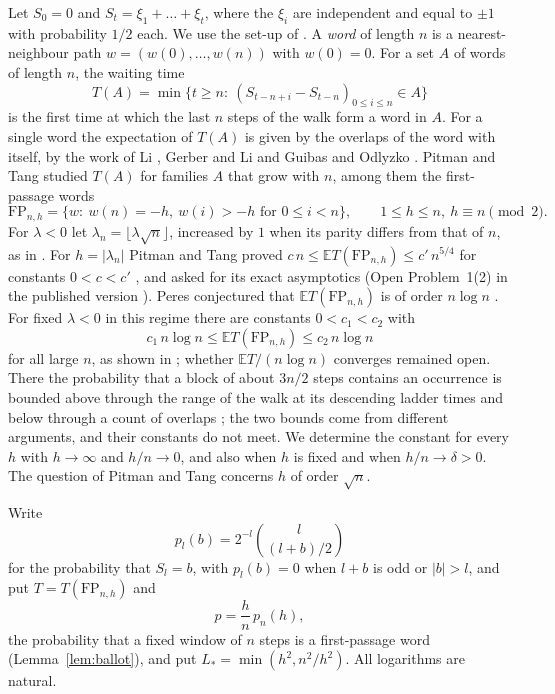 \documentclass[11pt]{amsart}
\theoremstyle{remark}
\numberwithin{equation}{section}
\newcommand{\EE}{\mathbb{E}}
\newcommand{\FP}{\mathrm{FP}}
\begin{document}
Let $S_0=0$ and $S_t=\xi_1+\dots+\xi_t$, where the $\xi_i$ are independent and equal to $\pm1$ with probability $1/2$ each. We use the set-up of \cite{Sh26}. A \emph{word} of length $n$ is a nearest-neighbour path $w=(w(0),\dots,w(n))$ with $w(0)=0$. For a set $A$ of words of length $n$, the waiting time
\[
T(A)=\min\{t\ge n:\ (S_{t-n+i}-S_{t-n})_{0\le i\le n}\in A\}
\]
is the first time at which the last $n$ steps of the walk form a word in $A$. For a single word the expectation of $T(A)$ is given by the overlaps of the word with itself, by the work of Li \cite{Li}, Gerber and Li \cite{GL} and Guibas and Odlyzko \cite{GO}. Pitman and Tang \cite{PT} studied $T(A)$ for families $A$ that grow with $n$, among them the first-passage words
\[
\FP_{n,h}=\{w:\ w(n)=-h,\ w(i)>-h\text{ for }0\le i<n\},\qquad 1\le h\le n,\ h\equiv n\pmod 2.
\]
For $\lambda<0$ let $\lambda_n=\lfloor\lambda\sqrt n\rfloor$, increased by $1$ when its parity differs from that of $n$, as in \cite{Sh26}. For $h=|\lambda_n|$ Pitman and Tang proved $c\,n\le\EE T(\FP_{n,h})\le c'\,n^{5/4}$ for constants $0<c<c'$ \cite[Theorem~1.8]{PT}, and asked for its exact asymptotics \cite[Open Problem~2.3(2)]{PT} (Open Problem~1(2) in the published version \cite{PTpub}). Peres conjectured that $\EE T(\FP_{n,h})$ is of order $n\log n$ \cite[Conjecture~1]{PTpub}. For fixed $\lambda<0$ in this regime there are constants $0<c_1<c_2$ with
\[
c_1\,n\log n\le\EE T(\FP_{n,h})\le c_2\,n\log n
\]
for all large $n$, as shown in \cite[Theorem~1.1 and the paragraph following it]{Sh26}; whether $\EE T/(n\log n)$ converges remained open. There the probability that a block of about $3n/2$ steps contains an occurrence is bounded above through the range of the walk at its descending ladder times \cite[Lemma~4.1]{Sh26} and below through a count of overlaps \cite[Lemma~4.3]{Sh26}; the two bounds come from different arguments, and their constants do not meet. We determine the constant for every $h$ with $h\to\infty$ and $h/n\to0$, and also when $h$ is fixed and when $h/n\to\delta>0$. The question of Pitman and Tang concerns $h$ of order $\sqrt n$.

Write
\[
p_l(b)=2^{-l}\binom{l}{(l+b)/2}
\]
for the probability that $S_l=b$, with $p_l(b)=0$ when $l+b$ is odd or $|b|>l$, and put $T=T(\FP_{n,h})$ and
\[
p=\frac hn\,p_n(h),
\]
the probability that a fixed window of $n$ steps is a first-passage word (Lemma~\ref{lem:ballot}), and put $L_*=\min(h^2,n^2/h^2)$. All logarithms are natural.
\end{document}
